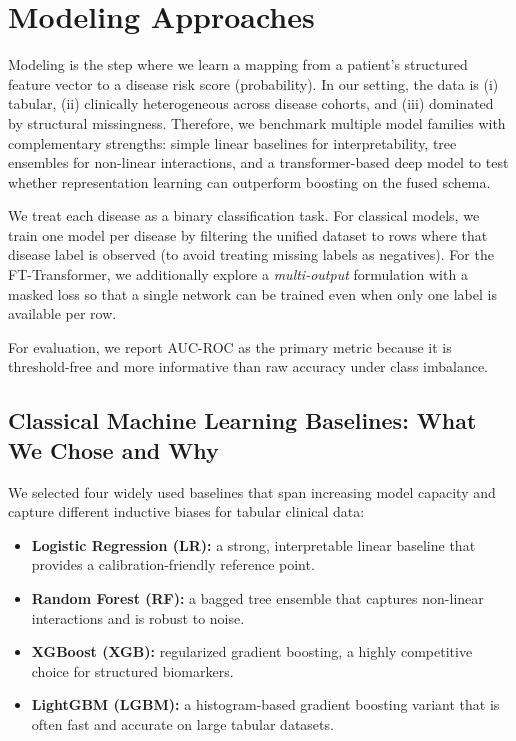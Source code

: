 \documentclass[journal]{IEEEtran}
\begin{document}
\section{Modeling Approaches}
Modeling is the step where we learn a mapping from a patient's structured feature vector to a disease risk score (probability). In our setting, the data is (i) tabular, (ii) clinically heterogeneous across disease cohorts, and (iii) dominated by structural missingness. Therefore, we benchmark multiple model families with complementary strengths: simple linear baselines for interpretability, tree ensembles for non-linear interactions, and a transformer-based deep model to test whether representation learning can outperform boosting on the fused schema.

We treat each disease as a binary classification task. For classical models, we train one model per disease by filtering the unified dataset to rows where that disease label is observed (to avoid treating missing labels as negatives). For the FT-Transformer, we additionally explore a \emph{multi-output} formulation with a masked loss so that a single network can be trained even when only one label is available per row.

For evaluation, we report AUC-ROC as the primary metric because it is threshold-free and more informative than raw accuracy under class imbalance.

\subsection{Classical Machine Learning Baselines: What We Chose and Why}
We selected four widely used baselines that span increasing model capacity and capture different inductive biases for tabular clinical data:
\begin{itemize}
    \item \textbf{Logistic Regression (LR):} a strong, interpretable linear baseline that provides a calibration-friendly reference point.
    \item \textbf{Random Forest (RF):} a bagged tree ensemble that captures non-linear interactions and is robust to noise.
    \item \textbf{XGBoost (XGB):} regularized gradient boosting, a highly competitive choice for structured biomarkers.
    \item \textbf{LightGBM (LGBM):} a histogram-based gradient boosting variant that is often fast and accurate on large tabular datasets.
\end{itemize}
\end{document}
